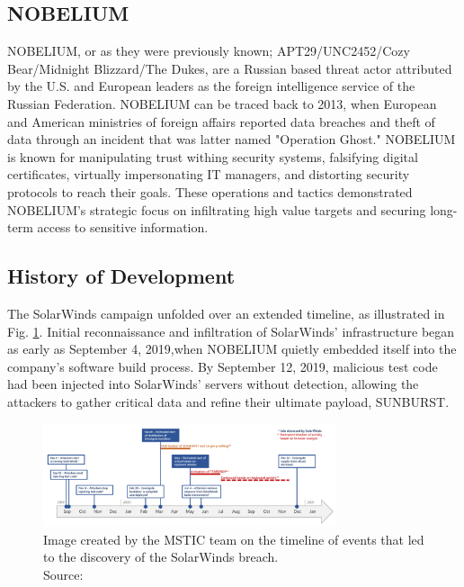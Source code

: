 \documentclass[conference]{IEEEtran}
\begin{document}
\subsection{NOBELIUM}
NOBELIUM, or as they were previously known; APT29/UNC2452/Cozy Bear/Midnight Blizzard/The Dukes,
are a Russian based threat actor attributed by the U.S. and European leaders as the foreign
intelligence service of the Russian Federation\cite{Microdoft2024NOBELIUM}. NOBELIUM can be traced back
to 2013, when European and American ministries of foreign affairs reported data breaches and theft of data 
through an incident that was latter named "Operation Ghost."\cite{MITREFirstNOBELIUMAttack} NOBELIUM is known for manipulating trust
withing security systems, falsifying digital certificates, virtually impersonating IT managers, and distorting security protocols
to reach their goals. These operations and tactics demonstrated NOBELIUM's strategic focus on infiltrating
high value targets and securing long-term access to sensitive information.\\

\subsection{History of Development}
The SolarWinds campaign unfolded over an extended timeline, as illustrated in Fig. \ref{fig:Timeline-of-Solorigate-attacks}. Initial 
reconnaissance and infiltration of SolarWinds’ infrastructure began as early as September 4, 2019,when NOBELIUM quietly embedded itself 
into the company’s software build process. By September 12, 2019, malicious test code had been injected into SolarWinds’ servers without
 detection, allowing the attackers to gather critical data and refine their ultimate payload, SUNBURST.\cite{MicrosoftDeepDiveSOLORIGATE}
\begin{figure}[H]
    \centering
    \includegraphics[width=3.4in]{Timeline-of-Solorigate-attacks.png}
    \caption{Image created by the MSTIC team on the timeline of events that led to the discovery of the SolarWinds
    breach.\\Source: \cite{MicrosoftDeepDiveSOLORIGATE} }
    \label{fig:Timeline-of-Solorigate-attacks}
\end{figure}
\end{document}
